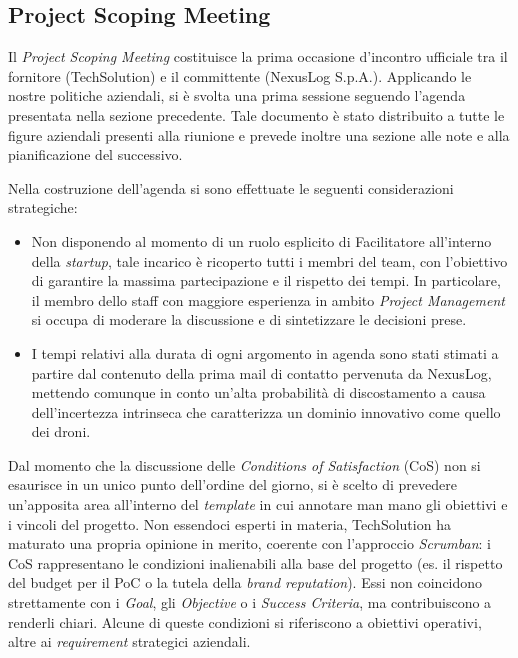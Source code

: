 \documentclass[12pt, a4paper]{article}
\begin{document}
\subsection{Project Scoping Meeting}
Il \textit{Project Scoping Meeting} costituisce la prima occasione d'incontro ufficiale tra il fornitore (TechSolution) e il committente (NexusLog S.p.A.). Applicando le nostre politiche aziendali, si è svolta una prima sessione seguendo l'agenda presentata nella sezione precedente. Tale documento è stato distribuito a tutte le figure aziendali presenti alla riunione e prevede inoltre una sezione alle note e alla pianificazione del successivo. 

Nella costruzione dell'agenda si sono effettuate le seguenti considerazioni strategiche:
\begin{itemize}
    \item Non disponendo al momento di un ruolo esplicito di Facilitatore all'interno della \textit{startup}, tale incarico è ricoperto tutti i membri del team, con l'obiettivo di garantire la massima partecipazione e il rispetto dei tempi. In particolare, il membro dello staff con maggiore esperienza in ambito \textit{Project Management} si occupa di moderare la discussione e di sintetizzare le decisioni prese.
    \item I tempi relativi alla durata di ogni argomento in agenda sono stati stimati a partire dal contenuto della prima mail di contatto pervenuta da NexusLog, mettendo comunque in conto un'alta probabilità di discostamento a causa dell'incertezza intrinseca che caratterizza un dominio innovativo come quello dei droni.
\end{itemize}

Dal momento che la discussione delle \textit{Conditions of Satisfaction} (CoS) non si esaurisce in un unico punto dell'ordine del giorno, si è scelto di prevedere un'apposita area all'interno del \textit{template} in cui annotare man mano gli obiettivi e i vincoli del progetto. Non essendoci esperti in materia, TechSolution ha maturato una propria opinione in merito, coerente con l'approccio \textit{Scrumban}: i CoS rappresentano le condizioni inalienabili alla base del progetto (es. il rispetto del budget per il PoC o la tutela della \textit{brand reputation}). Essi non coincidono strettamente con i \textit{Goal}, gli \textit{Objective} o i \textit{Success Criteria}, ma contribuiscono a renderli chiari. Alcune di queste condizioni si riferiscono a obiettivi operativi, altre ai \textit{requirement} strategici aziendali.
\end{document}
